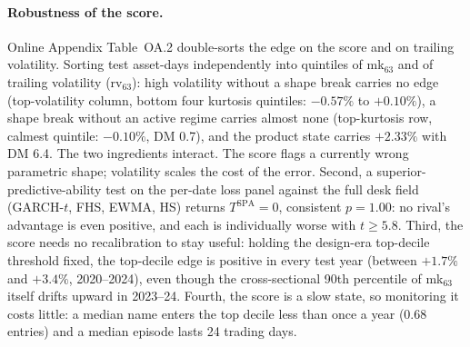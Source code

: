 \documentclass[11pt]{article}
\theoremstyle{remark}
\begin{document}
\paragraph{Robustness of the score.} Online Appendix Table~OA.2 double-sorts the edge on the score and on
trailing volatility. Sorting
test asset-days independently into quintiles of mk$_{63}$ and of
trailing volatility (rv$_{63}$): high volatility without a shape break
carries no edge (top-volatility column, bottom four kurtosis quintiles:
$-0.57\%$ to $+0.10\%$), a shape break without an active regime
carries almost none (top-kurtosis row, calmest quintile: $-0.10\%$,
DM 0.7), and the product state carries $+2.33\%$ with DM 6.4. The two ingredients interact. The score flags a currently wrong
parametric shape; volatility scales the cost of the error. Second, a
superior-predictive-ability test \citep{hansen2005spa} on the per-date
loss panel against the full desk field (GARCH-$t$, FHS, EWMA, HS)
returns $T^{\mathrm{SPA}} = 0$, consistent $p = 1.00$: no rival's
advantage is even positive, and each is individually worse with
$t \geq 5.8$. Third, the score needs no recalibration to stay useful:
holding the design-era top-decile threshold fixed, the top-decile edge
is positive in every test year (between $+1.7\%$ and $+3.4\%$,
2020--2024), even though the cross-sectional 90th percentile of
mk$_{63}$ itself drifts upward in 2023--24. Fourth, the score is a slow
state, so monitoring it costs little: a median name enters the top
decile less than once a year (0.68 entries) and a median episode lasts
24 trading days.
\end{document}
